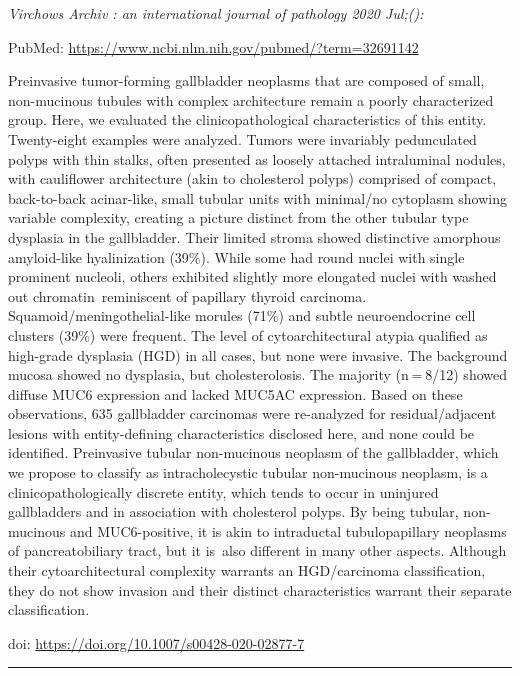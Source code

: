 \documentclass[
]{article}
\begin{document}
\emph{Virchows Archiv : an international journal of pathology 2020
Jul;():}

PubMed: \url{https://www.ncbi.nlm.nih.gov/pubmed/?term=32691142}

Preinvasive tumor-forming gallbladder neoplasms that are composed of
small, non-mucinous tubules with complex architecture remain a poorly
characterized group. Here, we evaluated the clinicopathological
characteristics of this entity. Twenty-eight examples were analyzed.
Tumors were invariably pedunculated polyps with thin stalks, often
presented as loosely attached intraluminal nodules, with cauliflower
architecture (akin to cholesterol polyps) comprised of compact,
back-to-back acinar-like, small tubular units with minimal/no cytoplasm
showing variable complexity, creating a picture distinct from the other
tubular type dysplasia in the gallbladder. Their limited stroma showed
distinctive amorphous amyloid-like hyalinization (39\%). While some had
round nuclei with single prominent nucleoli, others exhibited slightly
more elongated nuclei with washed out chromatin~reminiscent of papillary
thyroid carcinoma. Squamoid/meningothelial-like morules (71\%) and
subtle neuroendocrine cell clusters (39\%) were frequent. The level of
cytoarchitectural atypia qualified as high-grade dysplasia (HGD) in all
cases, but none were invasive. The background mucosa showed no
dysplasia, but cholesterolosis. The majority (n = 8/12) showed diffuse
MUC6 expression and lacked MUC5AC expression. Based on these
observations, 635 gallbladder carcinomas were re-analyzed for
residual/adjacent lesions with entity-defining characteristics disclosed
here, and none could be identified. Preinvasive tubular non-mucinous
neoplasm of the gallbladder, which we propose to classify as
intracholecystic tubular non-mucinous neoplasm, is a
clinicopathologically discrete entity, which tends to occur in uninjured
gallbladders and in association with cholesterol polyps. By being
tubular, non-mucinous and MUC6-positive, it is akin to intraductal
tubulopapillary neoplasms of pancreatobiliary tract, but it is~also
different in many other aspects. Although their cytoarchitectural
complexity warrants an HGD/carcinoma classification, they do not show
invasion and their distinct characteristics warrant their separate
classification.

doi: \url{https://doi.org/10.1007/s00428-020-02877-7}

\begin{center}\rule{0.5\linewidth}{0.5pt}\end{center}
\end{document}
